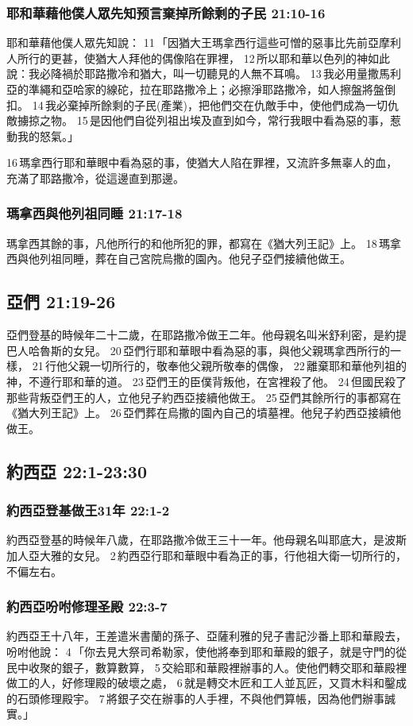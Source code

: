 \subsubsection{耶和華藉他僕人眾先知预言棄掉所餘剩的子民 21:10-16}
耶和華藉他僕人眾先知說： 11 「因猶大王瑪拿西行這些可憎的惡事比先前亞摩利人所行的更甚，使猶大人拜他的偶像陷在罪裡， 12 所以耶和華以色列的神如此說：我必降禍於耶路撒冷和猶大，叫一切聽見的人無不耳鳴。 13 我必用量撒馬利亞的準繩和亞哈家的線砣，拉在耶路撒冷上；必擦淨耶路撒冷，如人擦盤將盤倒扣。 14 我必棄掉所餘剩的子民(產業)，把他們交在仇敵手中，使他們成為一切仇敵擄掠之物。 15 是因他們自從列祖出埃及直到如今，常行我眼中看為惡的事，惹動我的怒氣。」

16 瑪拿西行耶和華眼中看為惡的事，使猶大人陷在罪裡，又流許多無辜人的血，充滿了耶路撒冷，從這邊直到那邊。

\subsubsection{瑪拿西與他列祖同睡 21:17-18}
瑪拿西其餘的事，凡他所行的和他所犯的罪，都寫在《猶大列王記》上。 18 瑪拿西與他列祖同睡，葬在自己宮院烏撒的園內。他兒子亞們接續他做王。

\subsection{亞們 21:19-26 }
亞們登基的時候年二十二歲，在耶路撒冷做王二年。他母親名叫米舒利密，是約提巴人哈魯斯的女兒。 20 亞們行耶和華眼中看為惡的事，與他父親瑪拿西所行的一樣， 21 行他父親一切所行的，敬奉他父親所敬奉的偶像， 22 離棄耶和華他列祖的神，不遵行耶和華的道。 23 亞們王的臣僕背叛他，在宮裡殺了他。 24 但國民殺了那些背叛亞們王的人，立他兒子約西亞接續他做王。 25 亞們其餘所行的事都寫在《猶大列王記》上。 26 亞們葬在烏撒的園內自己的墳墓裡。他兒子約西亞接續他做王。

\subsection{約西亞 22:1-23:30 }
\subsubsection{約西亞登基做王31年 22:1-2}
約西亞登基的時候年八歲，在耶路撒冷做王三十一年。他母親名叫耶底大，是波斯加人亞大雅的女兒。 2 約西亞行耶和華眼中看為正的事，行他祖大衛一切所行的，不偏左右。

\subsubsection{約西亞吩咐修理圣殿 22:3-7}
約西亞王十八年，王差遣米書蘭的孫子、亞薩利雅的兒子書記沙番上耶和華殿去，吩咐他說： 4 「你去見大祭司希勒家，使他將奉到耶和華殿的銀子，就是守門的從民中收聚的銀子，數算數算， 5 交給耶和華殿裡辦事的人。使他們轉交耶和華殿裡做工的人，好修理殿的破壞之處， 6 就是轉交木匠和工人並瓦匠，又買木料和鑿成的石頭修理殿宇。 7 將銀子交在辦事的人手裡，不與他們算帳，因為他們辦事誠實。」


